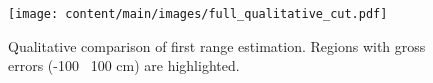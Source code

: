 \begin{figure}[t]
\centering
\texttt{[image: content/main/images/full\_qualitative\_cut.pdf]}
\caption{Qualitative comparison of first range estimation. Regions with gross errors (-100 \bwr~100 cm) are highlighted.}
\label{fig:full_qualitative}
\end{figure}